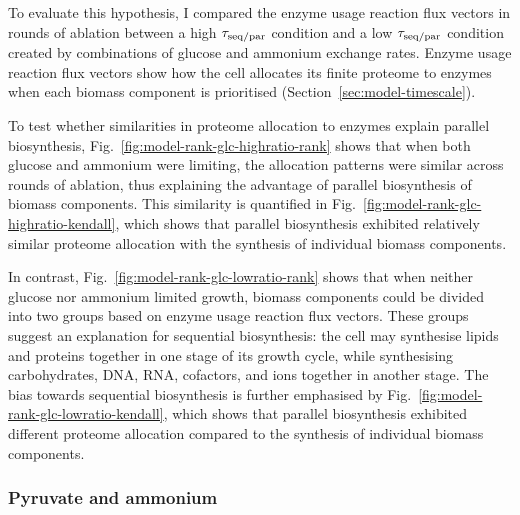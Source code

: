 To evaluate this hypothesis, I compared the enzyme usage reaction flux vectors in rounds of ablation between a high $\tau_{\mathrm{seq}/\mathrm{par}}$ condition and a low $\tau_{\mathrm{seq}/\mathrm{par}}$ condition created by combinations of glucose and ammonium exchange rates.
Enzyme usage reaction flux vectors show how the cell allocates its finite proteome to enzymes when each biomass component is prioritised (Section~\ref{sec:model-timescale}).

To test whether similarities in proteome allocation to enzymes explain parallel biosynthesis, Fig.\ \ref{fig:model-rank-glc-highratio-rank} shows that when both glucose and ammonium were limiting, the allocation patterns were similar across rounds of ablation, thus explaining the advantage of parallel biosynthesis of biomass components.
This similarity is quantified in Fig.\ \ref{fig:model-rank-glc-highratio-kendall}, which shows that parallel biosynthesis exhibited relatively similar proteome allocation with the synthesis of individual biomass components.

In contrast, Fig.\ \ref{fig:model-rank-glc-lowratio-rank} shows that when neither glucose nor ammonium limited growth, biomass components could be divided into two groups based on enzyme usage reaction flux vectors.
These groups suggest an explanation for sequential biosynthesis: the cell may synthesise lipids and proteins together in one stage of its growth cycle, while synthesising carbohydrates, DNA, RNA, cofactors, and ions together in another stage.
The bias towards sequential biosynthesis is further emphasised by Fig.\ \ref{fig:model-rank-glc-lowratio-kendall}, which shows that parallel biosynthesis exhibited different proteome allocation compared to the synthesis of individual biomass components.


\subsubsection{Pyruvate and ammonium}
\label{subsec:model-rank-pyruvate}

